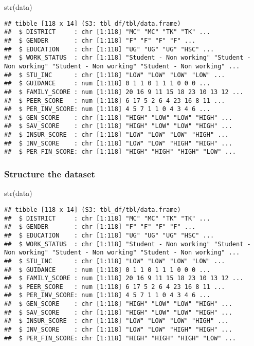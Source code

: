 \documentclass[
]{article}
\newenvironment{Shaded}{\begin{snugshade}}{\end{snugshade}}
\newcommand{\FunctionTok}[1]{\textcolor[rgb]{0.00,0.00,0.00}{#1}}
\newcommand{\NormalTok}[1]{#1}
\begin{document}
\begin{Shaded}
\begin{Highlighting}[]
\FunctionTok{str}\NormalTok{(data)}
\end{Highlighting}
\end{Shaded}

\begin{verbatim}
## tibble [118 x 14] (S3: tbl_df/tbl/data.frame)
##  $ DISTRICT     : chr [1:118] "MC" "MC" "TK" "TK" ...
##  $ GENDER       : chr [1:118] "F" "F" "F" "F" ...
##  $ EDUCATION    : chr [1:118] "UG" "UG" "UG" "HSC" ...
##  $ WORK_STATUS  : chr [1:118] "Student - Non working" "Student - Non working" "Student - Non working" "Student - Non working" ...
##  $ STU_INC      : chr [1:118] "LOW" "LOW" "LOW" "LOW" ...
##  $ GUIDANCE     : num [1:118] 0 1 1 0 1 1 1 0 0 0 ...
##  $ FAMILY_SCORE : num [1:118] 20 16 9 11 15 18 23 10 13 12 ...
##  $ PEER_SCORE   : num [1:118] 6 17 5 2 6 4 23 16 8 11 ...
##  $ PER_INV_SCORE: num [1:118] 4 5 7 1 1 0 4 3 4 6 ...
##  $ GEN_SCORE    : chr [1:118] "HIGH" "LOW" "LOW" "HIGH" ...
##  $ SAV_SCORE    : chr [1:118] "HIGH" "LOW" "LOW" "HIGH" ...
##  $ INSUR_SCORE  : chr [1:118] "LOW" "LOW" "LOW" "HIGH" ...
##  $ INV_SCORE    : chr [1:118] "LOW" "LOW" "HIGH" "HIGH" ...
##  $ PER_FIN_SCORE: chr [1:118] "HIGH" "HIGH" "HIGH" "LOW" ...
\end{verbatim}

\hypertarget{structure-the-dataset}{%
\subsubsection{Structure the dataset}\label{structure-the-dataset}}

\begin{Shaded}
\begin{Highlighting}[]
\FunctionTok{str}\NormalTok{(data)}
\end{Highlighting}
\end{Shaded}

\begin{verbatim}
## tibble [118 x 14] (S3: tbl_df/tbl/data.frame)
##  $ DISTRICT     : chr [1:118] "MC" "MC" "TK" "TK" ...
##  $ GENDER       : chr [1:118] "F" "F" "F" "F" ...
##  $ EDUCATION    : chr [1:118] "UG" "UG" "UG" "HSC" ...
##  $ WORK_STATUS  : chr [1:118] "Student - Non working" "Student - Non working" "Student - Non working" "Student - Non working" ...
##  $ STU_INC      : chr [1:118] "LOW" "LOW" "LOW" "LOW" ...
##  $ GUIDANCE     : num [1:118] 0 1 1 0 1 1 1 0 0 0 ...
##  $ FAMILY_SCORE : num [1:118] 20 16 9 11 15 18 23 10 13 12 ...
##  $ PEER_SCORE   : num [1:118] 6 17 5 2 6 4 23 16 8 11 ...
##  $ PER_INV_SCORE: num [1:118] 4 5 7 1 1 0 4 3 4 6 ...
##  $ GEN_SCORE    : chr [1:118] "HIGH" "LOW" "LOW" "HIGH" ...
##  $ SAV_SCORE    : chr [1:118] "HIGH" "LOW" "LOW" "HIGH" ...
##  $ INSUR_SCORE  : chr [1:118] "LOW" "LOW" "LOW" "HIGH" ...
##  $ INV_SCORE    : chr [1:118] "LOW" "LOW" "HIGH" "HIGH" ...
##  $ PER_FIN_SCORE: chr [1:118] "HIGH" "HIGH" "HIGH" "LOW" ...
\end{verbatim}
\end{document}
